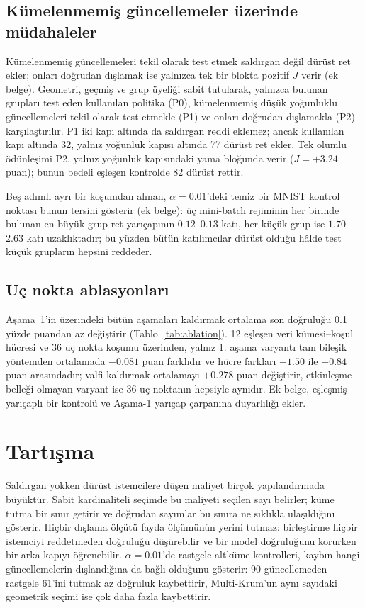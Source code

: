 \documentclass[journal]{IEEEtran}
\begin{document}
\subsection{Kümelenmemiş güncellemeler üzerinde müdahaleler}
Kümelenmemiş güncellemeleri tekil olarak test etmek saldırgan değil dürüst ret ekler; onları doğrudan dışlamak ise yalnızca tek bir blokta pozitif $J$ verir (ek belge). Geometri, geçmiş ve grup üyeliği sabit tutularak, yalnızca bulunan grupları test eden kullanılan politika (P0), kümelenmemiş düşük yoğunluklu güncellemeleri tekil olarak test etmekle (P1) ve onları doğrudan dışlamakla (P2) karşılaştırılır. P1 iki kapı altında da saldırgan reddi eklemez; ancak kullanılan kapı altında 32, yalnız yoğunluk kapısı altında 77 dürüst ret ekler. Tek olumlu ödünleşimi P2, yalnız yoğunluk kapısındaki yama bloğunda verir ($J=+3.24$ puan); bunun bedeli eşleşen kontrolde 82 dürüst rettir.

Beş adımlı ayrı bir koşumdan alınan, $\alpha=0.01$'deki temiz bir MNIST kontrol noktası bunun tersini gösterir (ek belge): üç mini-batch rejiminin her birinde bulunan en büyük grup ret yarıçapının $0.12$--$0.13$ katı, her küçük grup ise $1.70$--$2.63$ katı uzaklıktadır; bu yüzden bütün katılımcılar dürüst olduğu hâlde test küçük grupların hepsini reddeder.

\subsection{Uç nokta ablasyonları}

Aşama~1'in üzerindeki bütün aşamaları kaldırmak ortalama son doğruluğu 0.1 yüzde puandan az değiştirir (Tablo~\ref{tab:ablation}). 12 eşleşen veri kümesi--koşul hücresi ve 36 uç nokta koşumu üzerinden, yalnız 1. aşama varyantı tam bileşik yöntemden ortalamada $-0.081$ puan farklıdır ve hücre farkları $-1.50$ ile $+0.84$ puan arasındadır; valfi kaldırmak ortalamayı $+0.278$ puan değiştirir, etkinleşme belleği olmayan varyant ise 36 uç noktanın hepsiyle aynıdır. Ek belge, eşleşmiş yarıçaplı bir kontrolü ve Aşama-1 yarıçap çarpanına duyarlılığı ekler.

\section{Tartışma}\label{sec:discussion}
Saldırgan yokken dürüst istemcilere düşen maliyet birçok yapılandırmada büyüktür. Sabit kardinaliteli seçimde bu maliyeti seçilen sayı belirler; küme tutma bir sınır getirir ve doğrudan sayımlar bu sınıra ne sıklıkla ulaşıldığını gösterir. Hiçbir dışlama ölçütü fayda ölçümünün yerini tutmaz: birleştirme hiçbir istemciyi reddetmeden doğruluğu düşürebilir ve bir model doğruluğunu korurken bir arka kapıyı öğrenebilir. $\alpha=0.01$'de rastgele altküme kontrolleri, kaybın hangi güncellemelerin dışlandığına da bağlı olduğunu gösterir: 90 güncellemeden rastgele 61'ini tutmak az doğruluk kaybettirir, Multi-Krum'un aynı sayıdaki geometrik seçimi ise çok daha fazla kaybettirir.
\end{document}
